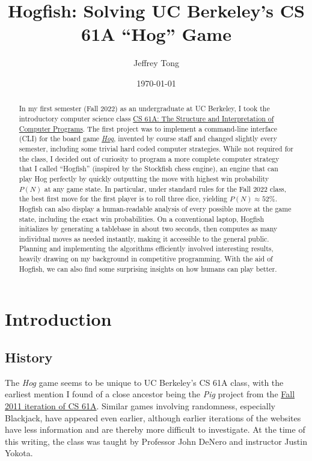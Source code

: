 \documentclass[12 pt]{article}
\title{Hogfish: Solving UC Berkeley's CS 61A ``Hog'' Game}
\author{Jeffrey Tong}
\date{\today}
\begin{document}
	\maketitle
	\thispagestyle{empty}

	\begin{abstract}
		In my first semester (Fall 2022) as an undergraduate at UC Berkeley, I took the introductory computer science class \href{https://inst.eecs.berkeley.edu/~cs61a/fa22/}{CS 61A: The Structure and Interpretation of Computer Programs}. The first project was to implement a command-line interface (CLI) for the board game \href{https://inst.eecs.berkeley.edu/~cs61a/fa22/proj/hog/}{\textit{Hog}}, invented by course staff and changed slightly every semester, including some trivial hard coded computer strategies. While not required for the class, I decided out of curiosity to program a more complete computer strategy that I called ``Hogfish'' (inspired by the Stockfish chess engine), an engine that can play Hog perfectly by quickly outputting the move with highest win probability $P(N)$ at any game state. In particular, under standard rules for the Fall 2022 class, the best first move for the first player is to roll three dice, yielding $P(N) \approx 52\%$. Hogfish can also display a human-readable analysis of every possible move at the game state, including the exact win probabilities. On a conventional laptop, Hogfish initializes by generating a tablebase in about two seconds, then computes as many individual moves as needed instantly, making it accessible to the general public. Planning and implementing the algorithms efficiently involved interesting results, heavily drawing on my background in competitive programming. With the aid of Hogfish, we can also find some surprising insights on how humans can play better.
	\end{abstract}

	\tableofcontents

	\newpage

	\section{Introduction}
		\subsection{History}
			The \textit{Hog} game seems to be unique to UC Berkeley's CS 61A class, with the earliest mention I found of a close ancestor being the \textit{Pig} project from the \href{https://inst.eecs.berkeley.edu/~cs61a/fa11/projects/pig/pig.html}{Fall 2011 iteration of CS 61A}. Similar games involving randomness, especially Blackjack, have appeared even earlier, although earlier iterations of the websites have less information and are thereby more difficult to investigate. At the time of this writing, the class was taught by Professor John DeNero and instructor Justin Yokota.
		
\end{document}
